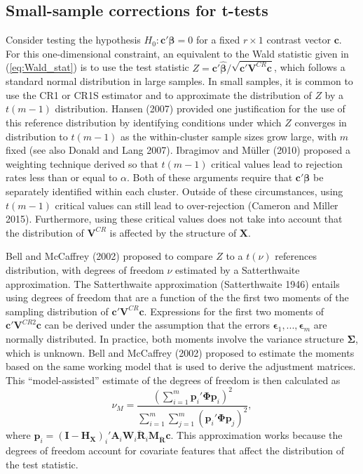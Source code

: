 \documentclass[12pt]{article}
\begin{document}
\hypertarget{subsec:t-tests}{%
\subsection{Small-sample corrections for t-tests}\label{subsec:t-tests}}

Consider testing the hypothesis \(H_0: \mathbf{c}'\boldsymbol\beta = 0\)
for a fixed \(r \times 1\) contrast vector \(\mathbf{c}\). For this
one-dimensional constraint, an equivalent to the Wald statistic given in
(\ref{eq:Wald_stat}) is to use the test statistic
\(Z = \mathbf{c}'\boldsymbol{\hat\beta} / \sqrt{\mathbf{c}'\mathbf{V}^{CR}\mathbf{c}}\),
which follows a standard normal distribution in large samples. In small
samples, it is common to use the CR1 or CR1S estimator and to
approximate the distribution of \(Z\) by a \(t(m - 1)\) distribution.
Hansen (2007) provided one justification for the use of this reference
distribution by identifying conditions under which \(Z\) converges in
distribution to \(t(m-1)\) as the within-cluster sample sizes grow
large, with \(m\) fixed (see also Donald and Lang 2007). Ibragimov and
Müller (2010) proposed a weighting technique derived so that \(t(m-1)\)
critical values lead to rejection rates less than or equal to
\(\alpha\). Both of these arguments require that
\(\mathbf{c}'\boldsymbol\beta\) be separately identified within each
cluster. Outside of these circumstances, using \(t(m-1)\) critical
values can still lead to over-rejection (Cameron and Miller 2015).
Furthermore, using these critical values does not take into account that
the distribution of \(\mathbf{V}^{CR}\) is affected by the structure of
\(\mathbf{X}\).

Bell and McCaffrey (2002) proposed to compare \(Z\) to a \(t(\nu)\)
references distribution, with degrees of freedom \(\nu\) estimated by a
Satterthwaite approximation. The Satterthwaite approximation
(Satterthwaite 1946) entails using degrees of freedom that are a
function of the the first two moments of the sampling distribution of
\(\mathbf{c}' \mathbf{V}^{CR} \mathbf{c}\). Expressions for the first
two moments of \(\mathbf{c}'\mathbf{V}^{CR2}\mathbf{c}\) can be derived
under the assumption that the errors
\(\boldsymbol\epsilon_1,...,\boldsymbol\epsilon_m\) are normally
distributed. In practice, both moments involve the variance structure
\(\boldsymbol\Sigma\), which is unknown. Bell and McCaffrey (2002)
proposed to estimate the moments based on the same working model that is
used to derive the adjustment matrices. This ``model-assisted'' estimate
of the degrees of freedom is then calculated as \begin{equation}
\label{eq:nu_model}
\nu_{M} = \frac{\left(\sum_{i=1}^m \mathbf{p}_i' \boldsymbol\Phi \mathbf{p}_i\right)^2}{\sum_{i=1}^m \sum_{j=1}^m \left(\mathbf{p}_i' \boldsymbol\Phi \mathbf{p}_j\right)^2},
\end{equation} where
\(\mathbf{p}_i = \left(\mathbf{I} - \mathbf{H_X}\right)_i'\mathbf{A}_i \mathbf{W}_i\mathbf{\ddot{R}}_i\mathbf{M_{\ddot{R}}} \mathbf{c}\).
This approximation works because the degrees of freedom account for
covariate features that affect the distribution of the test statistic.
\end{document}
